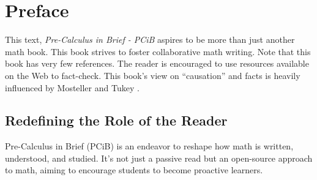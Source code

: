 \documentclass[a4paper,12pt]{book}
\begin{document}
\begin{titlepage}
\end{titlepage}

\tableofcontents
\cleardoublepage

\chapter*{Preface}
This text, \emph{Pre-Calculus in Brief - PCiB} aspires to be more than just another math book. This book strives to foster collaborative math writing. Note that this book has very few references. The reader is encouraged to use resources available on the Web to fact-check. This book's view on ``causation'' and facts is heavily influenced by Mosteller and Tukey \cite{mosteller1977}.

\section*{Redefining the Role of the Reader}
Pre-Calculus in Brief (PCiB) is an endeavor to reshape how math is written, understood, and studied. It's not just a passive read but an open-source approach to math, aiming to encourage students to become proactive learners.
\end{document}
